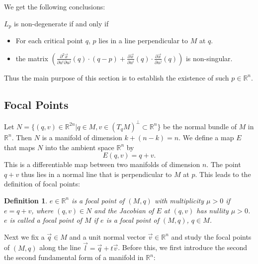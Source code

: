 \documentclass[a4paper,11pt,reqno]{amsart}
\newtheorem{defn}[thm]{Definition}
\newcommand{\RR}{\mathbb{R}}      %
\newcommand{\vect}[1]{\vec{#1}}
\begin{document}
We get the following conclusions:


$L_p$ is non-degenerate if and only if

\begin{itemize}
\item For each critical point $q$, $p$ lies in a line perpendicular to $M$ at
  $q$.
\item the matrix $\left(
    \frac{\partial^2 \vect{x}}{\partial u^i \partial u^j}(q) \cdot (q-p) +
    \frac{\partial \vect{x}}{\partial u^i}(q) \cdot \frac{\partial \vect{x}}{\partial u^j}(q)
  \right)$
  is non-singular.
\end{itemize}

Thus the main purpose of this section is to establish the existence of such $p
\in \RR^n$.

\subsection{Focal Points}

Let $N = \{ (q,v) \in \RR^{2n} | q \in M, v \in (T_qM)^{\perp} \subset \RR^n \}$
be the normal bundle of $M$ in $\RR^n$. Then $N$ is a manifold of dimension
$k+(n-k)=n$. We define a map $E$ that maps $N$ into the ambient space $\RR^n$ by
\begin{equation}
  E(q, v) = q + v.
\end{equation}
This is a differentiable map between two manifolds of dimension $n$. The point
$q+v$ thus lies in a normal line that is perpendicular to $M$ at $p$. This leads
to the definition of focal points:

\begin{defn}
  $e \in \RR^n$ is a focal point of $(M, q)$ with multiplicity $\mu > 0$ if $e =
  q+v$, where $(q, v) \in N$ and the Jacobian of $E$ at $(q, v)$ has nullity
  $\mu > 0$. $e$ is called a focal point of $M$ if $e$ is a focal point of $(M,
  q)$, $q \in M$.
\end{defn}

Next we fix a $\vect{q} \in M$ and a unit normal vector $\vect{v} \in \RR^n$ and
study the focal points of $(M, q)$ along the line $\vect{l} =
\vect{q}+t\vect{v}$. Before this, we first introduce the second the second
fundamental form of a manifold in $\RR^n$:
\end{document}
